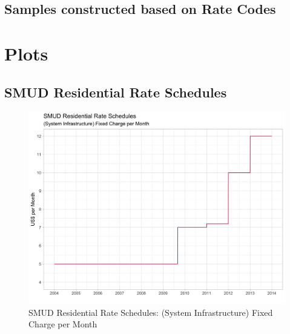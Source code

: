 \clearpage



\clearpage
\subsection{Samples constructed based on Rate Codes}


\clearpage


\clearpage


\clearpage



\clearpage
\section{Plots}
\vspace{0.5cm}

\subsection{SMUD Residential Rate Schedules}
\vspace{0.5cm}

\begin{figure}
    \centering
    \includegraphics[scale = 0.18]{02_Plots/SMUD-Residential-Rate-Schedules_Fixed-Charge}
    \caption{SMUD Residential Rate Schedules: (System Infrastructure) Fixed Charge per Month}
    \label{Figure:Residential-Rate-Schedules_Fixed-Charge}
\end{figure}

